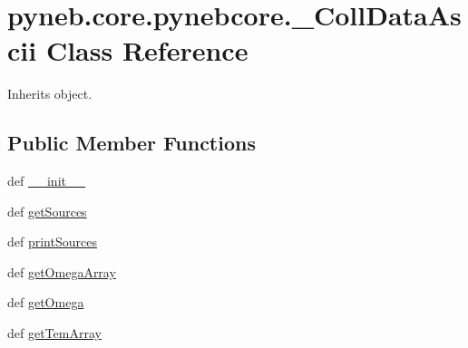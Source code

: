 \hypertarget{classpyneb_1_1core_1_1pynebcore_1_1___coll_data_ascii}{\section{pyneb.\-core.\-pynebcore.\-\_\-\-Coll\-Data\-Ascii Class Reference}
\label{classpyneb_1_1core_1_1pynebcore_1_1___coll_data_ascii}
}


Inherits object.

\subsection*{Public Member Functions}
\begin{DoxyCompactItemize}
\item 
def \hyperlink{classpyneb_1_1core_1_1pynebcore_1_1___coll_data_ascii_ad4514c646ad1e65d9d5e10c80d215041}{\-\_\-\-\_\-init\-\_\-\-\_\-}
\item 
def \hyperlink{classpyneb_1_1core_1_1pynebcore_1_1___coll_data_ascii_a5de4640ac21cae33af4145c058dc62ef}{get\-Sources}
\item 
def \hyperlink{classpyneb_1_1core_1_1pynebcore_1_1___coll_data_ascii_a7080ede9cd690fb81537ca37c0286d78}{print\-Sources}
\item 
def \hyperlink{classpyneb_1_1core_1_1pynebcore_1_1___coll_data_ascii_ac78bf2ddca80543884f09c2924308351}{get\-Omega\-Array}
\item 
def \hyperlink{classpyneb_1_1core_1_1pynebcore_1_1___coll_data_ascii_a2f99c08a0f6a46d88b6e09b0a36495c2}{get\-Omega}
\item 
def \hyperlink{classpyneb_1_1core_1_1pynebcore_1_1___coll_data_ascii_aaf234dd4932c7f789eb8eaaf6a16cfc9}{get\-Tem\-Array}
\end{DoxyCompactItemize}
